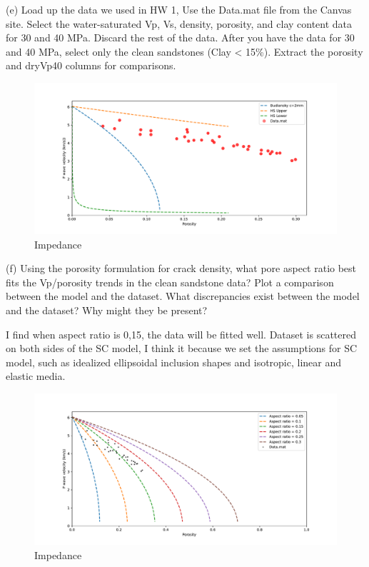 \begin{problem}{(e)}
    Load up the data we used in HW 1, Use the Data.mat file from the Canvas site. Select the water-saturated Vp, Vs, density, porosity, and clay content data for 30 and 40 MPa. Discard the rest of the data. After you have the data for 30 and 40 MPa, select only the clean sandstones (Clay < 15\%). Extract the porosity and dryVp40 columns for comparisons.
\end{problem}
\begin{solution}
    \begin{figure}[H]
        \centering
        \includegraphics[width=1\textwidth]{figures/homework-2/p2-e.pdf}
        \caption{Impedance}
        \label{fig:p2-e}
    \end{figure}
\end{solution}

\begin{problem}{(f)}
    Using the porosity formulation for crack density, what pore aspect ratio best fits the Vp/porosity trends in the clean sandstone data? Plot a comparison between the model and the dataset. What discrepancies exist between the model and the dataset? Why might they be present?
\end{problem}
\begin{solution}
    I find when aspect ratio is 0,15, the data will be fitted well.
    Dataset is scattered on both sides of the SC model, I think it because we set the assumptions for SC model,
    such as idealized ellipsoidal inclusion shapes and isotropic, linear and elastic media.
    \begin{figure}[H]
        \centering
        \includegraphics[width=1\textwidth]{figures/homework-2/p2-f.pdf}
        \caption{Impedance}
        \label{fig:p2-f}
    \end{figure}
\end{solution}



